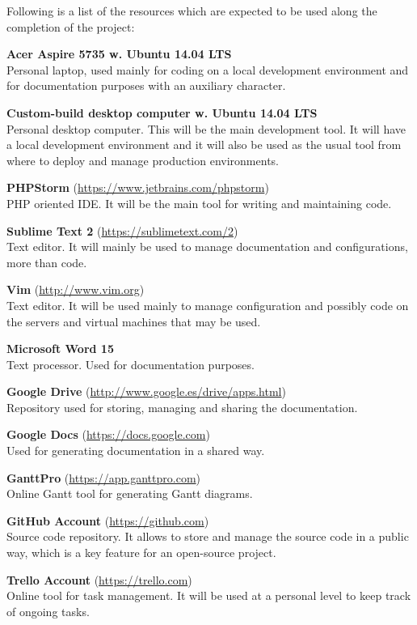 Following is a list of the resources which are expected to be used along the completion of the project:

\begin{addmargin}[1em]{0em}
\textbf{Acer Aspire 5735 w. Ubuntu 14.04 LTS}\\
Personal laptop, used mainly for coding on a local development environment and for documentation purposes with an auxiliary character.

\textbf{Custom-build desktop computer w. Ubuntu 14.04 LTS}\\
Personal desktop computer. This will be the main development tool. It will have a local development environment and it will also be used as the usual tool from where to deploy and manage production environments.

\textbf{PHPStorm} (\url{https://www.jetbrains.com/phpstorm})\\
PHP oriented IDE. It will be the main tool for writing and maintaining code.

\textbf{Sublime Text 2} (\url{https://sublimetext.com/2})\\
Text editor. It will mainly be used to manage documentation and configurations, more than code.

\textbf{Vim} (\url{http://www.vim.org})\\
Text editor. It will be used mainly to manage configuration and possibly code on the servers and virtual machines that may be used.

\textbf{Microsoft Word 15}\\
Text processor. Used for documentation purposes.

\textbf{Google Drive} (\url{http://www.google.es/drive/apps.html})\\
Repository used for storing, managing and sharing the documentation.

\textbf{Google Docs} (\url{https://docs.google.com})\\
Used for generating documentation in a shared way.

\textbf{GanttPro} (\url{https://app.ganttpro.com})\\
Online Gantt tool for generating Gantt diagrams.

\textbf{GitHub Account} (\url{https://github.com})\\
Source code repository. It allows to store and manage the source code in a public way, which is a key feature for an open-source project.

\textbf{Trello Account} (\url{https://trello.com})\\
Online tool for task management. It will be used at a personal level to keep track of ongoing tasks.


\end{addmargin}
